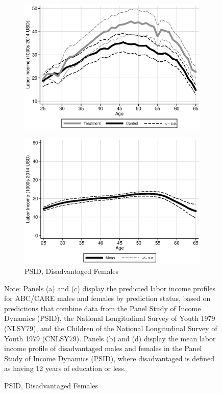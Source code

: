 \begin{figure}
\begin{subfigure}[h]{0.4\textwidth}
		\includegraphics[width=\textwidth]{output/labor_25-60_female_5.eps}
\end{subfigure}%
\begin{subfigure}[h]{0.4\textwidth}
	\centering
	\caption{PSID, Disadvantaged Females} \label{fig:psid0}
		\includegraphics[width=\textwidth]{output/psid_incomeprofiles_s0.eps}
\end{subfigure}
\footnotesize \justify
Note: Panels (a) and (c) display the predicted labor income profiles for ABC/CARE males and females by prediction status, based on predictions that combine data from the Panel Study of Income Dynamics (PSID), the National Longitudinal Survey of Youth 1979 (NLSY79), and the Children of the National Longitudinal Survey of Youth 1979 (CNLSY79). Panels (b) and (d) display the mean labor income profile of disadvantaged males and females in the Panel Study of Income Dynamics (PSID), where disadvantaged is defined as having 12 years of education or less.\\
\end{figure}

